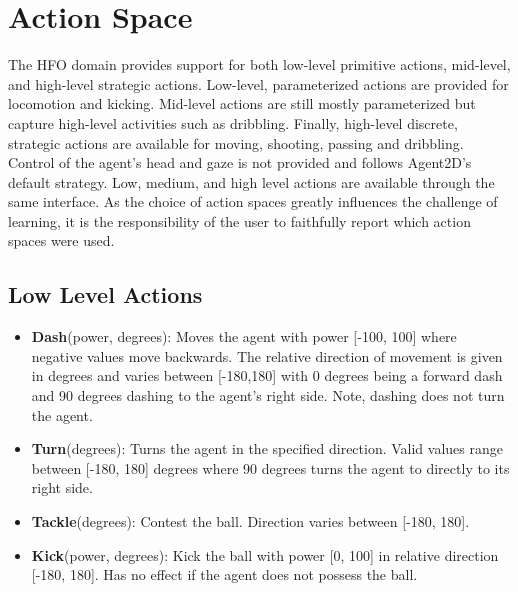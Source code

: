 \documentclass[12pt]{article}
\begin{document}
\section{Action Space}
The HFO domain provides support for both low-level primitive actions,
mid-level, and high-level strategic actions. Low-level, parameterized
actions are provided for locomotion and kicking. Mid-level actions are
still mostly parameterized but capture high-level activities such as
dribbling. Finally, high-level discrete, strategic actions are
available for moving, shooting, passing and dribbling. Control of the
agent's head and gaze is not provided and follows Agent2D's default
strategy. Low, medium, and high level actions are available through
the same interface. As the choice of action spaces greatly influences
the challenge of learning, it is the responsibility of the user to
faithfully report which action spaces were used.

\subsection{Low Level Actions}
\label{sec:low_level_actions}
\begin{itemize}[noitemsep]
\item{\textbf{Dash}(power, degrees): Moves the agent with power [-100,
    100] where negative values move backwards. The relative direction
  of movement is given in degrees and varies between [-180,180] with 0
  degrees being a forward dash and 90 degrees dashing to the agent's
  right side. Note, dashing does not turn the agent.}
\item{\textbf{Turn}(degrees): Turns the agent in the
  specified direction. Valid values range between [-180, 180] degrees
  where 90 degrees turns the agent to directly to its right side.}
\item{\textbf{Tackle}(degrees): Contest the ball. Direction
  varies between [-180, 180].}
\item{\textbf{Kick}(power, degrees): Kick the ball with power [0, 100]
  in relative direction [-180, 180]. Has no effect if the agent does
  not possess the ball.}
\end{itemize}
\end{document}
